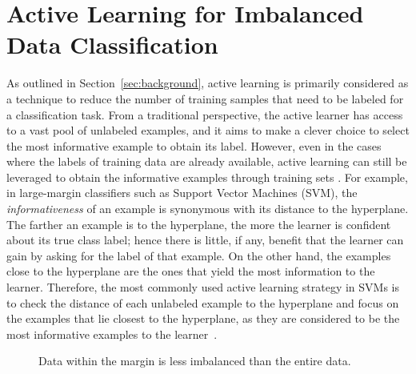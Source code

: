 \section{Active Learning for Imbalanced Data Classification}
\label{al_for_imbalanced_data}
As outlined in Section~\ref{sec:background}, active learning is primarily considered as a technique to reduce the number of training samples that need to be labeled for a classification task. From a traditional perspective, the active learner has access to a vast pool of unlabeled examples, and it aims to make a clever choice to select the most informative example to obtain its label. However, even in the cases where the labels of training data are already available, active learning can still be leveraged to obtain the informative examples through training sets \cite{Schohn_2000,Bordes_2005,Huang_2006}. For example, in large-margin classifiers such as Support Vector Machines (SVM), the \textit{informativeness} of an example is synonymous with its distance to the hyperplane. The farther an example is to the hyperplane, the more the learner is confident about its true class label; hence there is little, if any, benefit that the learner can gain by asking for the label of that example. On the other hand, the examples close to the hyperplane are the ones that yield the most information to the learner. Therefore, the most commonly used active learning strategy in SVMs is to check the distance of each unlabeled example to the hyperplane and focus on the examples that lie closest to the hyperplane, as they are considered to be the most informative examples to the learner~\cite{tong02svm}.

\begin{figure}[t!]
    \centering
    \caption{Data within the margin is less imbalanced than the entire data.}
    \label{fig:alimbshade}
\end{figure}

